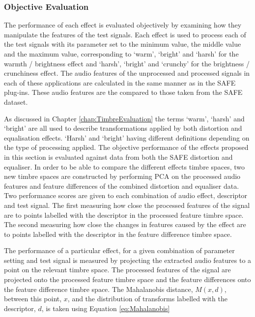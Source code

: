 		\subsubsection*{Objective Evaluation}
			The performance of each effect is evaluated objectively by examining how they manipulate the
			features of the test signals. Each effect is used to process each of the test signals with its
			parameter set to the minimum value, the middle value and the maximum value, corresponding to
			`warm', `bright' and `harsh' for the warmth / brightness effect and `harsh', `bright' and `crunchy'
			for the brightness / crunchiness effect. The audio features of the unprocessed and processed
			signals in each of these applications are calculated in the same manner as in the SAFE plug-ins.
			These audio features are the compared to those taken from the SAFE dataset.

			As discussed in Chapter \ref{chap:TimbreEvaluation} the terms `warm', `harsh' and `bright' are all
			used to describe transformations applied by both distortion and equalisation effects. `Harsh' and
			`bright' having different definitions depending on the type of processing applied. The objective
			performance of the effects proposed in this section is evaluated against data from both the SAFE
			distortion and equaliser. In order to be able to compare the different effects timbre spaces, two
			new timbre spaces are constructed by performing PCA on the processed audio features and feature
			differences of the combined distortion and equaliser data. Two performance scores are given to each
			combination of audio effect, descriptor and test signal. The first measuring how close the
			processed features of the signal are to points labelled with the descriptor in the processed
			feature timbre space.  The second measuring how close the changes in features caused by the effect
			are to points labelled with the descriptor in the feature difference timbre space.

			The performance of a particular effect, for a given combination of parameter setting and test
			signal is measured by projecting the extracted audio features to a point on the relevant timbre
			space. The processed features of the signal are projected onto the processed feature timbre space
			and the feature differences onto the feature difference timbre space. The Mahalanobis distance,
			$M(x, d)$, between this point, $x$, and the distribution of transforms labelled with the
			descriptor, $d$, is taken using Equation \ref{eq:Mahalanobis}
			
